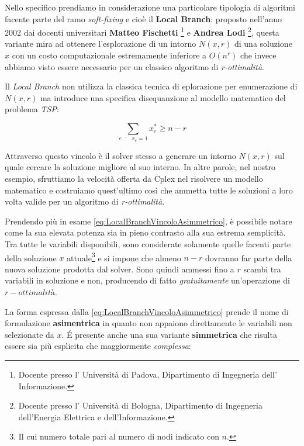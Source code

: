 \documentclass[11pt]{article}
\begin{document}
Nello specifico prendiamo in considerazione una particolare tipologia di algoritmi facente parte del ramo \textit{soft-fixing} e cioè il \textbf{Local Branch}: proposto nell'anno 2002 dai docenti universitari \textbf{Matteo Fischetti} \footnote{Docente presso l' Università di Padova, Dipartimento di Ingegneria dell’ Informazione.} e \textbf{Andrea Lodi} \footnote{Docente presso l' Università di Bologna, Dipartimento di Ingegneria dell'Energia Elettrica e dell'Informazione.}, questa variante mira ad ottenere l'esplorazione di un intorno $N(x,r)$ di una soluzione $x$ con un costo computazionale estremamente inferiore a $O(n^r)$ che invece abbiamo visto essere necessario per un classico algoritmo di \textit{r-ottimalità}.

Il \textit{Local Branch} non utilizza la classica tecnica di eplorazione per enumerazione di $N(x,r)$ ma introduce una specifica disequanzione al modello matematico del problema \textit{TSP}:


\begin{equation}\label{eq:LocalBranchVincoloAsimmetrico}
\displaystyle\sum_{e \text{ } : \text{ } x_e = 1} x_e^{*} \ge n - r
\end{equation}

Attraverso questo vincolo è il solver stesso a generare un intorno $N(x,r)$ sul quale cercare la soluzione migliore al suo interno. In altre parole, nel nostro esempio, sfruttiamo la velocità offerta da Cplex nel risolvere un modello matematico e costruiamo quest'ultimo così che ammetta tutte le soluzioni a loro volta valide per un algoritmo di \textit{r-ottimalità}.

Prendendo più in esame \eqref{eq:LocalBranchVincoloAsimmetrico}, è possibile notare come la sua elevata potenza sia in pieno contrasto alla sua estrema semplicità. Tra tutte le variabili disponibili, sono considerate solamente quelle facenti parte della soluzione $x$ attuale\footnote{Il cui numero totale pari al numero di nodi indicato con $n$.} e si impone che almeno $n-r$ dovranno far parte della nuova soluzione prodotta dal solver. Sono quindi ammessi fino a $r$ scambi tra variabili in soluzione e non, producendo di fatto \textit{gratuitamente} un'operazione di $r-ottimalità$.

La forma espressa dalla \eqref{eq:LocalBranchVincoloAsimmetrico} prende il nome di formulazione \textbf{asimentrica} in quanto non appaiono direttamente le variabili non selezionate da $x$. \'E presente anche una sua variante \textbf{simmetrica} che risulta essere sia più esplicita che maggiormente \textit{complessa}:
\end{document}
